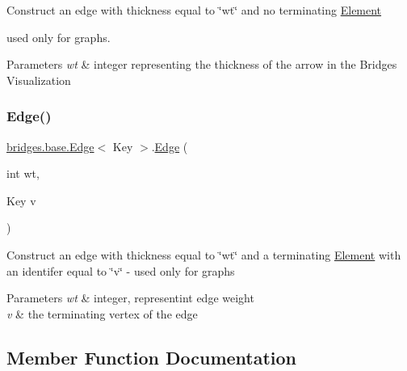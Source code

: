 Construct an edge with thickness equal to \char`\"{}wt\char`\"{} and no terminating \hyperlink{classbridges_1_1base_1_1_element}{Element}
\begin{DoxyItemize}
\item used only for graphs. 
\begin{DoxyParams}{Parameters}
{\em wt} & integer representing the thickness of the arrow in the Bridges Visualization \\
\hline
\end{DoxyParams}

\end{DoxyItemize}\hypertarget{classbridges_1_1base_1_1_edge_a503c093e63f5df1071233427496d9d08}{}\label{classbridges_1_1base_1_1_edge_a503c093e63f5df1071233427496d9d08} 
\subsubsection{\texorpdfstring{Edge()}{Edge()}\hspace{0.1cm}{\footnotesize\ttfamily [3/3]}}
{\footnotesize\ttfamily \hyperlink{classbridges_1_1base_1_1_edge}{bridges.\+base.\+Edge}$<$ Key $>$.\hyperlink{classbridges_1_1base_1_1_edge}{Edge} (\begin{DoxyParamCaption}\item[{int}]{wt,  }\item[{Key}]{v }\end{DoxyParamCaption})}

Construct an edge with thickness equal to \char`\"{}wt\char`\"{} and a terminating \hyperlink{classbridges_1_1base_1_1_element}{Element} with an identifer equal to \char`\"{}v\char`\"{} -\/ used only for graphs 
\begin{DoxyParams}{Parameters}
{\em wt} & integer, representint edge weight \\
\hline
{\em v} & the terminating vertex of the edge \\
\hline
\end{DoxyParams}


\subsection{Member Function Documentation}
\hypertarget{classbridges_1_1base_1_1_edge_a666bb076c206e572d9fca072b58db162}{}\label{classbridges_1_1base_1_1_edge_a666bb076c206e572d9fca072b58db162} 
